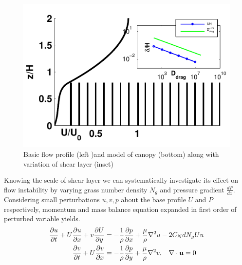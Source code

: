 \documentclass[aps,twocolumn,floatfix,prl,10pt]{revtex4-1}
\newcommand{\bu}{\mathbf{u}}
\newcommand{\del}{\partial}
\begin{document}
\begin{figure}[htb!]
  \includegraphics[]{fig1}
\caption{Basic flow profile (left )and model of canopy (bottom) along with variation of shear layer (inset) }
\end{figure}
Knowing the scale of shear layer we can systematically investigate its effect on flow instability
by varying grass number density $N_g$ and pressure gradient $\frac{dP}{dx}$. Considering small perturbations $u, v, p$ about the base profile $U$ and $P$
respectively, momentum and mass balance equation expanded in first order of perturbed variable yields.
\begin{equation}
\begin{split}
\frac{\del u}{\del t}+U\frac{\del u}{\del x}+v\frac{\del U}{\del y} &= -\frac{1}{\rho}\frac{\del p}{\del x}+\frac{\mu}{\rho}\nabla^2u-2C_{N}dN_{g}Uu\\
\frac{\del v}{\del  t}+ U\frac{\del v}{\del x} &= -\frac{1}{\rho}\frac{\del p}{\del y}+\frac{\mu}{\rho}\nabla^2v, \hspace{0.3cm} \nabla\cdot\bu=0\\
\end{split}
\end{equation}
\end{document}
